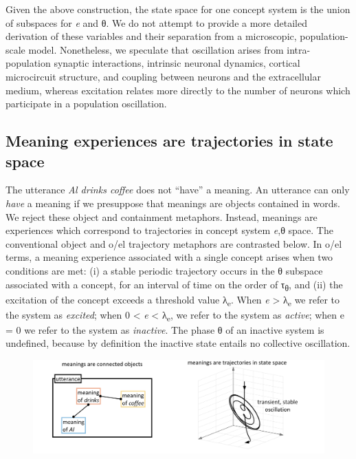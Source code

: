   Given the above construction, the state space for one concept system is the union of subspaces for \textit{e} and θ. We do not attempt to provide a more detailed derivation of these variables and their separation from a microscopic, population-scale model. Nonetheless, we speculate that oscillation arises from intra-population synaptic interactions, intrinsic neuronal dynamics, cortical microcircuit structure, and coupling between neurons and the extracellular medium, whereas excitation relates more directly to the number of neurons which participate in a population oscillation.  

\subsection{Meaning experiences are trajectories in state space}

The utterance \textit{Al drinks coffee} does not “have” a meaning. An utterance can only \textit{have} a meaning if we presuppose that meanings are objects contained in words. We reject these object and containment metaphors. Instead, meanings are experiences which correspond to trajectories in concept system \textit{e},θ space. The conventional object and o/el trajectory metaphors are contrasted below. In o/el terms, a meaning experience associated with a single concept arises when two conditions are met: (i) a stable periodic trajectory occurs in the θ subspace associated with a concept, for an interval of time on the order of τ\textsubscript{θ}, and (ii) the excitation of the concept exceeds a threshold value λ\textsubscript{e}. When \textit{e} > λ\textsubscript{e} we refer to the system as \textit{excited}; when 0 < \textit{e} < λ\textsubscript{e}, we refer to the system as \textit{active}; when e = 0 we refer to the system as \textit{inactive}. The phase θ of an inactive system is undefined, because by definition the inactive state entails no collective oscillation. 

  
\begin{figure}
\includegraphics[width=\textwidth]{figures/Tilsen-img13.png}
\caption{\missingcaption}
\label{fig:}
\end{figure}
 

